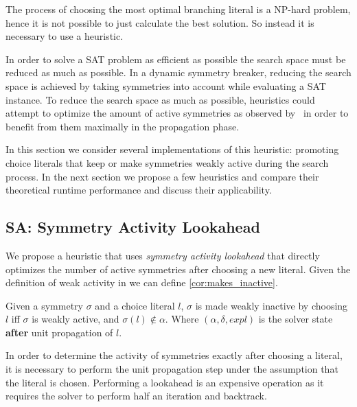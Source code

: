 
The process of choosing the most optimal branching literal is a NP-hard problem, hence it is not
possible to
just calculate the best solution. So instead it is necessary to use a heuristic.

In order to solve a SAT problem as efficient as possible the search space must be reduced as much as
possible.
In a dynamic symmetry breaker, reducing the search space
is achieved by taking symmetries into account while evaluating a SAT instance.
To reduce the search space as much as possible, heuristics could attempt to optimize the amount of
active symmetries as observed by~\cite{devriendt2012symmetry} in order to benefit from them
maximally in the propagation phase.

In this section we consider several implementations of this heuristic: promoting choice literals
that keep or make symmetries weakly active during the search process.
In the next section we propose a few heuristics and compare their theoretical runtime performance
and discuss their applicability.

\subsection{SA: Symmetry Activity Lookahead}
	We propose a heuristic that uses \emph{symmetry activity lookahead} that directly optimizes the number of
	active symmetries after choosing a new literal.
	Given the definition of weak activity in \cite{devriendt2012symmetry} we can define
	\cref{cor:makes_inactive}.\\

	\begin{corollary}
		\label{cor:makes_inactive}
		Given a symmetry $\sigma$ and a choice literal $l$,
		$\sigma$ is made weakly inactive by choosing $l$ iff
		$\sigma$ is weakly active, and $\sigma(l) \notin \alpha$.
		Where $(\alpha,\delta,\textit{expl})$ is the solver state \textbf{after} unit propagation of $l$.
	\end{corollary}

	In order to determine the activity of symmetries exactly after choosing a literal,
	it is necessary to perform the unit propagation step under the assumption that the literal is chosen.
	Performing a lookahead is an expensive operation as it requires the solver to perform half an
	iteration and backtrack.

